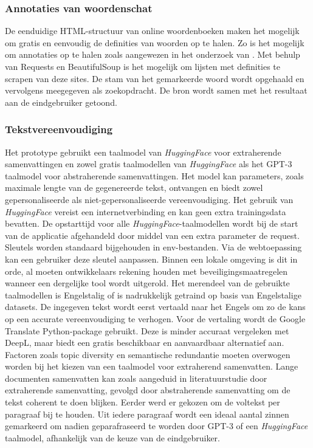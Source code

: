 \subsubsection{Annotaties van woordenschat}

De eenduidige HTML-structuur van online woordenboeken maken het mogelijk om gratis en eenvoudig de definities van woorden op te halen. Zo is het mogelijk om annotaties op te halen zoals aangewezen in het onderzoek van \textcite{Bulte2018}. Met behulp van Requests en BeautifulSoup is het mogelijk om lijsten met definities te scrapen van deze sites. De stam van het gemarkeerde woord wordt opgehaald en vervolgens meegegeven als zoekopdracht. De bron wordt samen met het resultaat aan de eindgebruiker getoond. 

\subsubsection{Tekstvereenvoudiging}

Het prototype gebruikt een taalmodel van \textit{HuggingFace} voor extraherende samenvattingen en zowel gratis taalmodellen van \textit{HuggingFace} als het GPT-3 taalmodel voor abstraherende samenvattingen. Het model kan parameters, zoals maximale lengte van de gegenereerde tekst, ontvangen en biedt zowel gepersonaliseerde als niet-gepersonaliseerde vereenvoudiging. Het gebruik van \textit{HuggingFace} vereist een internetverbinding en kan geen extra trainingsdata bevatten. De opstarttijd voor alle \textit{HuggingFace}-taalmodellen wordt bij de start van de applicatie afgehandeld door middel van een extra parameter de request. Sleutels worden standaard bijgehouden in env-bestanden. Via de webtoepassing kan een gebruiker deze sleutel aanpassen. Binnen een lokale omgeving is dit in orde, al moeten ontwikkelaars rekening houden met beveiligingsmaatregelen wanneer een dergelijke tool wordt uitgerold. Het merendeel van de gebruikte taalmodellen is Engelstalig of is nadrukkelijk getraind op basis van Engelstalige datasets. De ingegeven tekst wordt eerst vertaald naar het Engels om zo de kans op een accurate vereenvoudiging te verhogen. Voor de vertaling wordt de Google Translate Python-package gebruikt. Deze is minder accuraat vergeleken met DeepL, maar biedt een gratis beschikbaar en aanvaardbaar alternatief aan. Factoren zoals topic diversity en semantische redundantie moeten overwogen worden bij het kiezen van een taalmodel voor extraherend samenvatten. Lange documenten samenvatten kan zoals aangeduid in literatuurstudie door extraherende samenvatting, gevolgd door abstraherende samenvatting om de tekst coherent te doen blijken. Eerder werd er gekozen om de voltekst per paragraaf bij te houden. Uit iedere paragraaf wordt een ideaal aantal zinnen gemarkeerd om nadien geparafraseerd te worden door GPT-3 of een \textit{HuggingFace} taalmodel, afhankelijk van de keuze van de eindgebruiker.


